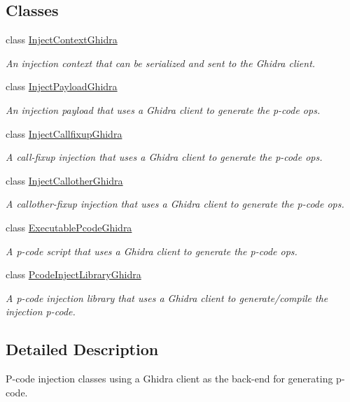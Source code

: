 \subsection*{Classes}
\begin{DoxyCompactItemize}
\item 
class \mbox{\hyperlink{class_inject_context_ghidra}{Inject\+Context\+Ghidra}}
\begin{DoxyCompactList}\small\item\em An injection context that can be serialized and sent to the Ghidra client. \end{DoxyCompactList}\item 
class \mbox{\hyperlink{class_inject_payload_ghidra}{Inject\+Payload\+Ghidra}}
\begin{DoxyCompactList}\small\item\em An injection payload that uses a Ghidra client to generate the p-\/code ops. \end{DoxyCompactList}\item 
class \mbox{\hyperlink{class_inject_callfixup_ghidra}{Inject\+Callfixup\+Ghidra}}
\begin{DoxyCompactList}\small\item\em A call-\/fixup injection that uses a Ghidra client to generate the p-\/code ops. \end{DoxyCompactList}\item 
class \mbox{\hyperlink{class_inject_callother_ghidra}{Inject\+Callother\+Ghidra}}
\begin{DoxyCompactList}\small\item\em A callother-\/fixup injection that uses a Ghidra client to generate the p-\/code ops. \end{DoxyCompactList}\item 
class \mbox{\hyperlink{class_executable_pcode_ghidra}{Executable\+Pcode\+Ghidra}}
\begin{DoxyCompactList}\small\item\em A {\itshape p-\/code} {\itshape script} that uses a Ghidra client to generate the p-\/code ops. \end{DoxyCompactList}\item 
class \mbox{\hyperlink{class_pcode_inject_library_ghidra}{Pcode\+Inject\+Library\+Ghidra}}
\begin{DoxyCompactList}\small\item\em A p-\/code injection library that uses a Ghidra client to generate/compile the injection p-\/code. \end{DoxyCompactList}\end{DoxyCompactItemize}


\subsection{Detailed Description}
P-\/code injection classes using a Ghidra client as the back-\/end for generating p-\/code. 


